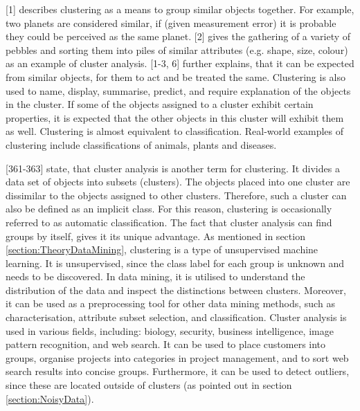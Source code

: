 

\textcite{hartigan1975clustering}[1] describes clustering as a means to group similar objects together. For example, two planets are considered similar, if (given measurement error) it is probable they could be perceived as the same planet. \textcite{romesburg2004cluster}[2] gives the gathering of a variety of pebbles and sorting them into piles of similar attributes (e.g. shape, size, colour) as an example of cluster analysis. \textcite{hartigan1975clustering}[1-3, 6] further explains, that it can be expected from similar objects, for them to act and be treated the same. Clustering is also used to name, display, summarise, predict, and require explanation of the objects in the cluster. If some of the objects assigned to a cluster exhibit certain properties, it is expected that the other objects in this cluster will exhibit them as well. Clustering is almost equivalent to classification. Real-world examples of clustering include classifications of animals, plants and diseases.

\textcite{han2011data}[361-363] state, that cluster analysis is another term for clustering. It divides a data set of objects into subsets (clusters). The objects placed into one cluster are dissimilar to the objects assigned to other clusters. Therefore, such a cluster can also be defined as an implicit class. For this reason, clustering is occasionally referred to as automatic classification. The fact that cluster analysis can find groups by itself, gives it its unique advantage. As mentioned in section \ref{section:TheoryDataMining}, clustering is a type of unsupervised machine learning. It is unsupervised, since the class label for each group is unknown and needs to be discovered. In data mining, it is utilised to understand the distribution of the data and inspect the distinctions between clusters. Moreover, it can be used as a preprocessing tool for other data mining methods, such as characterisation, attribute subset selection, and classification.
Cluster analysis is used in various fields, including: biology, security, business intelligence, image pattern recognition, and web search. It can be used to place customers into groups, organise projects into categories in project management, and to sort web search results into concise groups. Furthermore, it can be used to detect outliers, since these are located outside of clusters (as pointed out in section \ref{section:NoisyData}).


